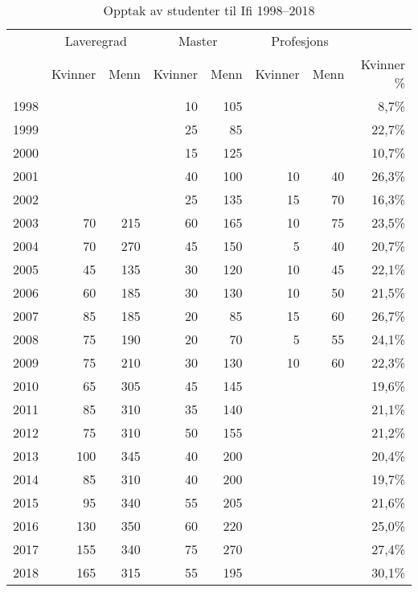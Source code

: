 \begin{table}[]
	\begin{tabular}{|r|r|r|r|r|r|r|r|}
		\cline{2-7}
		\multicolumn{1}{r|}{} & \multicolumn{2}{c|}{Laveregrad} & \multicolumn{2}{c|}{Master}  & \multicolumn{2}{c|}{Profesjons} & \multicolumn{1}{r}{} \\
		\cline{2-8}
		\multicolumn{1}{r|}{} & Kvinner & Menn & Kvinner & Menn & Kvinner & Menn & Kvinner \% \\
		\hline
		1998 & & & 10 & 105 & & & 8,7\% \\
		\hline
		1999 & & & 25 & 85 & & & 22,7\% \\
		\hline
		2000 & & & 15 & 125 & & & 10,7\% \\
		\hline
		2001 & & & 40 & 100 & 10 & 40 & 26,3\% \\
		\hline
		2002 & & & 25 & 135 & 15 & 70 & 16,3\% \\
		\hline
		2003 & 70 & 215 & 60 & 165 & 10 & 75 & 23,5\% \\
		\hline
		2004 & 70 & 270 & 45 & 150 & 5 & 40 & 20,7\% \\
		\hline
		2005 & 45 & 135 & 30 & 120 & 10 & 45 & 22,1\% \\
		\hline
		2006 & 60 & 185 & 30 & 130 & 10 & 50 & 21,5\% \\
		\hline
		2007 & 85 & 185 & 20 & 85 & 15 & 60 & 26,7\% \\
		\hline
		2008 & 75 & 190 & 20 & 70 & 5 & 55 & 24,1\% \\
		\hline
		2009 & 75 & 210 & 30 & 130 & 10 & 60 & 22,3\% \\
		\hline
		2010 & 65 & 305 & 45 & 145 & & & 19,6\% \\
		\hline
		2011 & 85 & 310 & 35 & 140 & & & 21,1\% \\
		\hline
		2012 & 75 & 310 & 50 & 155 & & & 21,2\% \\
		\hline
		2013 & 100 & 345 & 40 & 200 & & & 20,4\% \\
		\hline
		2014 & 85 & 310 & 40 & 200 & & & 19,7\% \\
		\hline
		2015 & 95 & 340 & 55 & 205 & & & 21,6\% \\
		\hline
		2016 & 130 & 350 & 60 & 220 & & & 25,0\% \\
		\hline
		2017 & 155 & 340 & 75 & 270 & & & 27,4\% \\
		\hline
		2018 & 165 & 315 & 55 & 195 & & & 30,1\% \\
		\hline
	\end{tabular}
	\caption{Opptak av studenter til Ifi 1998--2018}
	\label{table:kvinneandel}
\end{table}


